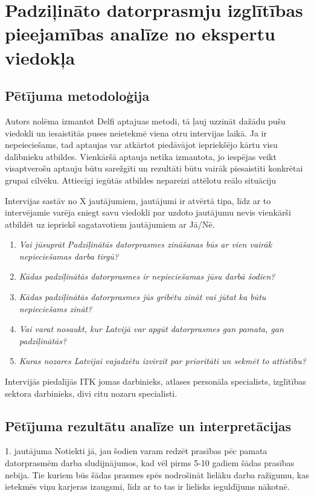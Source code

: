 \section{Padziļināto datorprasmju izglītības pieejamības analīze no ekspertu viedokļa}
\subsection{Pētījuma metodoloģija}
Autors nolēma izmantot Delfi aptajuas metodi, tā ļauj uzzināt dažādu pušu viedokli un iesaistītās puses
neietekmē viena otru intervijas laikā. Ja ir nepeieciešams, tad aptaujas var atkārtot piedāvājot iepriekšējo
kārtu visu dalībnieku atbildes. Vienkāršā aptauja netika izmantota, jo iespējas veikt visaptverošu aptauju būtu sarežgīti
un rezultāti būtu vairāk piesaistīti konkrētai grupai cilvēku. Attiecīgi iegūtās atbildes nepareizi attēlotu reālo situāciju
\par
Intervijas sastāv no X jautājumiem, jautājumi ir atvērtā tipa, līdz ar to intervējamie varēja sniegt savu viedokli par
uzdoto jautājumu nevis vienkārši atbildēt uz iepriekš sagatavotiem jautājumiem ar Jā/Nē.
\begin{enumerate}
    \item \textit{Vai jūsuprāt Padziļinātās datorprasmes zināšanas būs ar vien vairāk nepieciešamas darba tirgū?}
    \item \textit{Kādas padziļinātās datorprasmes ir nepieciešamas jūsu darbā šodien?}
    \item \textit{Kādas padziļinātās datorprasmes jūs gribētu zināt vai jūtat ka būtu nepieciešams zināt?}
    \item \textit{Vai varat nosaukt, kur Latvijā var apgūt datorprasmes gan pamata, gan padziļinātās?}
    \item \textit{Kuras nozares Latvijai vajadzētu izvirzīt par prioritāti un sekmēt to attīstību?}
\end{enumerate}
\par
Intervijās piedalījās ITK jomas darbinieks, atlases personāla specialists, izglītības sektora darbinieks,
divi citu nozaru specialisti.
\subsection{Pētījuma rezultātu analīze un interpretācijas}
1. jautājuma 
Notiekti jā, jau šodien varam redzēt prasības pēc pamata datorprasmēm darba sludijnājumos, kad vēl pirms 5-10 gadiem
šādas prasības nebija.
Tie kuriem būs šādas prasmes spēs nodrošināt lielāku darba ražīgumu, kas ietekmēs viņu karjeras izaugsmi, līdz ar to 
tas ir lielisks ieguldījums nākotnē.
